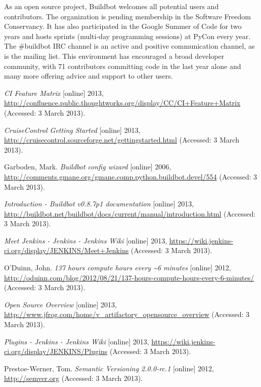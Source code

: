 \documentclass[conference]{IEEEtran}
\begin{document}
As an open source project, Buildbot welcomes all potential users and contributors.
The organization is pending membership in the Software Freedom Conservancy.
It has also participated in the Google Summer of Code for two years and hosts sprints (multi-day programming sessions) at PyCon every year.
The \#buildbot IRC channel is an active and positive communication channel, as is the mailing list.
This environment has encouraged a broad developer community, with 71 contributors committing code in the last year alone and many more offering advice and support to other users.

\begin{thebibliography}{13}

\textit{CI Feature Matrix} [online] 2013, \url{http://confluence.public.thoughtworks.org/display/CC/CI+Feature+Matrix} (Accessed: 3 March 2013).

\textit{CruiseControl Getting Started} [online] 2013, \url{http://cruisecontrol.sourceforge.net/gettingstarted.html} (Accessed: 3 March 2013).

Garboden, Mark.  \textit{Buildbot config wizard} [online] 2006, \url{http://comments.gmane.org/gmane.comp.python.buildbot.devel/554} (Accessed: 3 March 2013).

\textit{Introduction - Buildbot v0.8.7p1 documentation} [online] 2013, \url{http://buildbot.net/buildbot/docs/current/manual/introduction.html} (Accessed: 3 March 2013).

\textit{Meet Jenkins - Jenkins - Jenkins Wiki} [online] 2013, \url{https://wiki.jenkins-ci.org/display/JENKINS/Meet+Jenkins} (Accessed: 3 March 2013).

O'Duinn, John.  \textit{137 hours compute hours every \textasciitilde 6 minutes} [online] 2012, \url{http://oduinn.com/blog/2012/08/21/137-hours-compute-hours-every-6-minutes/} (Accessed: 3 March 2013).

\textit{Open Source Overview} [online] 2013, \url{http://www.jfrog.com/home/v_artifactory_opensource_overview} (Accessed: 3 March 2013).

\textit{Plugins - Jenkins - Jenkins Wiki} [online] 2013, \url{https://wiki.jenkins-ci.org/display/JENKINS/Plugins} (Accessed: 3 March 2013).

Prestoe-Werner, Tom. \textit{Semantic Versioning 2.0.0-rc.1} [online] 2012, \url{http://semver.org} (Accessed: 3 March 2013).


\end{thebibliography}
\end{document}

